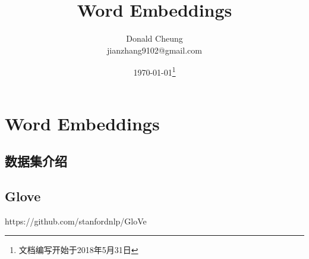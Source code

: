 \ifx\projectsnotes\undefined
    \providecommand{\notesroot}{../..}
    \providecommand{\wordembeddingroots}{.}

    \title{Word Embeddings}
    \author{Donald Cheung\\jianzhang9102@gmail.com}
    \date{\today\footnote{文档编写开始于2018年5月31日}}

    
\else
    \providecommand{\wordembeddingroots}{\projectsroot/word_embeddings}
\fi

\chapter{Word Embeddings}

\section{数据集介绍}

\section{Glove}
https://github.com/stanfordnlp/GloVe

\ifx\projectsnotes\undefined
    
\fi
